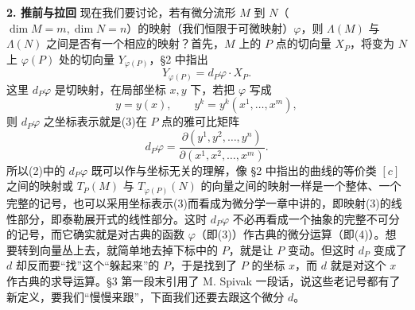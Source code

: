 \noindent\textbf{2. 推前与拉回}\quad
现在我们要讨论，若有微分流形 $M$ 到 $N$（$\dim M=m,\dim N=n$）的映射（我们恒限于可微映射）$\varphi$，则 $\Lambda(M)$ 与 $\Lambda(N)$ 之间是否有一个相应的映射？首先，$M$ 上的 $P$ 点的切向量 $X_P$，将变为 $N$ 上 $\varphi(P)$ 处的切向量 $Y_{\varphi(P)}$，§2 中指出
\begin{equation}
 Y_{\varphi(P)}=d_P\varphi\cdot X_P.
 \tag{2}
\end{equation}
这里 $d_P\varphi$ 是切映射，在局部坐标 $x,y$ 下，若把 $\varphi$ 写成
\begin{equation}
 y=y(x),\qquad y^k=y^k(x^1,\ldots,x^m),
 \tag{3}
\end{equation}
则 $d_P\varphi$ 之坐标表示就是(3)在 $P$ 点的雅可比矩阵
\begin{equation}
 d_P\varphi=\frac{\partial(y^1,y^2,\ldots,y^n)}{\partial(x^1,x^2,\ldots,x^m)}.
 \tag{4}
\end{equation}
所以(2)中的 $d_P\varphi$ 既可以作与坐标无关的理解，像 §2 中指出的曲线的等价类 $[c]$ 之间的映射或 $T_P(M)$ 与 $T_{\varphi(P)}(N)$ 的向量之间的映射一样是一个整体、一个完整的记号，也可以采用坐标表示(3)而看成为微分学一章中讲的，即映射(3)的线性部分，即泰勒展开式的线性部分。这时 $d_P\varphi$ 不必再看成一个抽象的完整不可分的记号，而它确实就是对古典的函数 $\varphi$（即(3)）作古典的微分运算（即(4)）。想要转到向量丛上去，就简单地去掉下标中的 $P$，就是让 $P$ 变动。但这时 $d_P$ 变成了 $d$ 却反而要“找”这个“躲起来”的 $P$，于是找到了 $P$ 的坐标 $x$，而 $d$ 就是对这个 $x$ 作古典的求导运算。§3 第一段末引用了 M. Spivak 一段话，说这些老记号都有了新定义，要我们“慢慢来跟”，下面我们还要去跟这个微分 $d$。

